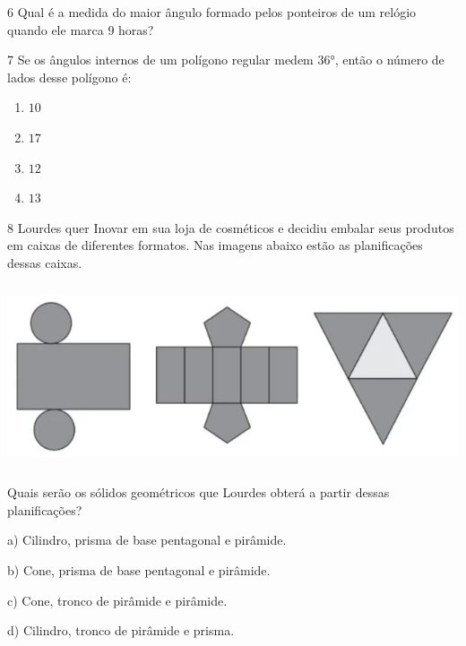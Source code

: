 


\num{6}  Qual é a medida do maior ângulo formado pelos ponteiros de um relógio
quando ele marca $9$ horas?


\num{7}  Se os ângulos internos de um polígono regular medem $36$°, então o
número de lados desse polígono é:

\begin{multicols}{2}\baselineskip 
\begin{enumerate}\def\labelenumi{\alph{enumi})}
\item $10$

\item $17$

\item $12$

\item $13$
\end{enumerate}
\end{multicols}


\num{8}  Lourdes quer Inovar em sua loja de cosméticos e decidiu embalar seus
produtos em caixas de diferentes formatos. Nas imagens abaixo estão as
planificações dessas caixas.


\includegraphics[width=5.90625in,height=2.125in]{./imgSAEB_6_MAT/media/image51.png}

Quais serão os sólidos geométricos que Lourdes obterá a partir dessas
planificações?

a) Cilindro, prisma de base pentagonal e pirâmide.

b) Cone, prisma de base pentagonal e pirâmide.

c) Cone, tronco de pirâmide e pirâmide.

d) Cilindro, tronco de pirâmide e prisma.

